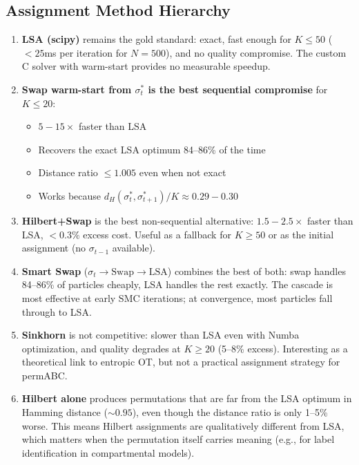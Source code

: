 \documentclass[11pt,a4paper]{article}
\begin{document}
\subsection{Assignment Method Hierarchy}

\begin{enumerate}
  \item \textbf{LSA (scipy)} remains the gold standard: exact, fast enough for $K \le 50$ ($< 25$ms per iteration for $N=500$), and no quality compromise. The custom C solver with warm-start provides no measurable speedup.

  \item \textbf{Swap warm-start from $\sigma_t^*$ is the best sequential compromise} for $K \le 20$:
  \begin{itemize}
    \item $5{-}15\times$ faster than LSA
    \item Recovers the exact LSA optimum 84--86\% of the time
    \item Distance ratio $\le 1.005$ even when not exact
    \item Works because $d_H(\sigma_t^*, \sigma_{t+1}^*)/K \approx 0.29{-}0.30$
  \end{itemize}

  \item \textbf{Hilbert+Swap} is the best non-sequential alternative: $1.5{-}2.5\times$ faster than LSA, $<0.3\%$ excess cost. Useful as a fallback for $K \ge 50$ or as the initial assignment (no $\sigma_{t-1}$ available).

  \item \textbf{Smart Swap} ($\sigma_t \to \text{Swap} \to \text{LSA}$) combines the best of both: swap handles 84--86\% of particles cheaply, LSA handles the rest exactly. The cascade is most effective at early SMC iterations; at convergence, most particles fall through to LSA.

  \item \textbf{Sinkhorn} is not competitive: slower than LSA even with Numba optimization, and quality degrades at $K \ge 20$ (5--8\% excess). Interesting as a theoretical link to entropic OT, but not a practical assignment strategy for permABC.

  \item \textbf{Hilbert alone} produces permutations that are far from the LSA optimum in Hamming distance ($\sim 0.95$), even though the distance ratio is only 1--5\% worse. This means Hilbert assignments are qualitatively different from LSA, which matters when the permutation itself carries meaning (e.g., for label identification in compartmental models).
\end{enumerate}
\end{document}

